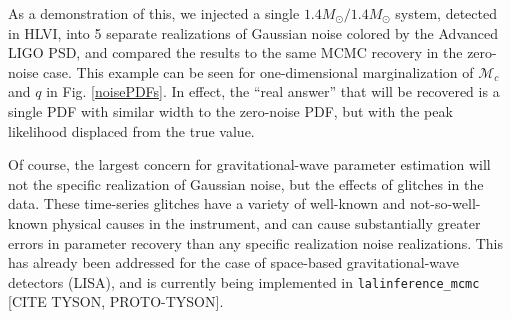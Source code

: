 \documentclass[11pt,a4paper]{emulateapj}
\newcommand{\carl}[1]{{\color{red}  #1}}
\begin{document}
As a demonstration of this, we injected a single $1.4M_{\odot}/1.4M_{\odot}$ system, 
detected in HLVI,  into 5 separate realizations of Gaussian noise colored by the Advanced LIGO PSD, 
and compared the results to the same MCMC recovery in the zero-noise case.  This example
can be seen for one-dimensional marginalization of $\mathcal{M}_c$ and $q$ in Fig. \ref{noisePDFs}.  In effect, the ``real answer'' that will be recovered is a single PDF with similar 
width to the zero-noise PDF, but with the peak likelihood displaced from the true value.  

Of course, the largest concern for gravitational-wave parameter estimation will not the specific
realization of Gaussian noise, but the effects of glitches in the data.  These time-series 
glitches have a variety of well-known and not-so-well-known physical causes in the instrument,
and can cause substantially greater errors in parameter recovery than any specific realization noise realizations.  This has already been addressed for the case of space-based gravitational-wave
detectors (LISA), and is currently being implemented in \texttt{lalinference\_mcmc} 
\carl{[CITE TYSON, PROTO-TYSON]}.
\end{document}
